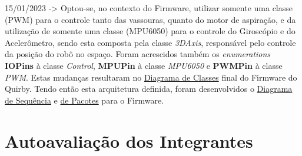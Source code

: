 15/01/2023 -> Optou-se, no contexto do Firmware, utilizar somente uma classe (PWM) para o controle tanto das vassouras, quanto do motor de aspiração, e da utilização de somente uma classe (MPU6050) para o controle do Giroscópio e do Acelerômetro, sendo esta composta pela classe \textit{3DAxis}, responsável pelo controle da posição do robô no espaço. Foram acrescidos também os \textit{enumerations} \textbf{IOPins} à classe \textit{Control}, \textbf{MPUPin} à classe \textit{MPU6050} e \textbf{PWMPin} à classe \textit{PWM}. Estas mudanças resultaram no \hyperref[sec:DiagramaClasses]{Diagrama de Classes} final do Firmware do Quirby. Tendo então esta arquitetura definida, foram desenvolvidos o \hyperref[sec:DiagramaSequencia]{Diagrama de Sequência} e \hyperref[sec:DiagramaPacotes]{de Pacotes} para o Firmware.

\chapter{Autoavaliação dos Integrantes}
\centering
